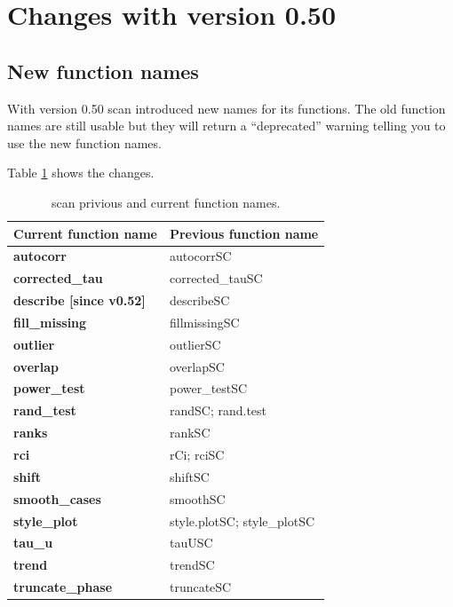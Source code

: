 \documentclass[
]{book}
\begin{document}
\hypertarget{changes-with-version-0.50}{%
\section{Changes with version 0.50}\label{changes-with-version-0.50}}

\hypertarget{new-function-names}{%
\subsection{New function names}\label{new-function-names}}

With version 0.50 scan introduced new names for its functions. The old function names are still usable but they will return a ``deprecated'' warning telling you to use the new function names.

Table \ref{tab:table-aliases} shows the changes.

\begin{table}

\caption{\label{tab:table-aliases}scan privious and current function names.}
\centering
\begin{tabular}[t]{>{\raggedright\arraybackslash}p{15em}>{\raggedright\arraybackslash}p{30em}}
\toprule
Current function name & Previous function name\\
\midrule
\textbf{autocorr} & autocorrSC\\
\textbf{corrected\_tau} & corrected\_tauSC\\
\textbf{describe [since v0.52]} & describeSC\\
\textbf{fill\_missing} & fillmissingSC\\
\textbf{outlier} & outlierSC\\
\addlinespace
\textbf{overlap} & overlapSC\\
\textbf{power\_test} & power\_testSC\\
\textbf{rand\_test} & randSC; rand.test\\
\textbf{ranks} & rankSC\\
\textbf{rci} & rCi; rciSC\\
\addlinespace
\textbf{shift} & shiftSC\\
\textbf{smooth\_cases} & smoothSC\\
\textbf{style\_plot} & style.plotSC; style\_plotSC\\
\textbf{tau\_u} & tauUSC\\
\textbf{trend} & trendSC\\
\addlinespace
\textbf{truncate\_phase} & truncateSC\\
\bottomrule
\end{tabular}
\end{table}
\end{document}
